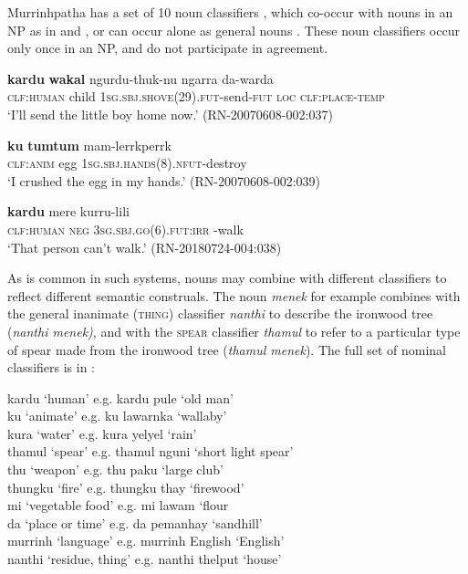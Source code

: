 \documentclass[output=paper,colorlinks,citecolor=brown]{langscibook}
\begin{document}
Murrinhpatha has a set of 10 noun classifiers \citep{Walsh1993}, which co-occur with nouns in an NP as in  and , or can occur alone as general nouns . These noun classifiers occur only once in an NP, and do not participate in agreement. 

\ea\label{ex:mur:36} 
    \gll \textbf{kardu} \textbf{wakal} ngurdu-thuk-nu ngarra da-warda\\
         \textsc{clf:human} child \textsc{1sg.sbj.shove}(29).\textsc{fut}{}-send-\textsc{fut} \textsc{loc} \textsc{clf:place-temp} \\
    \glt  ‘I’ll send the little boy home now.’ (RN-20070608-002:037)
\z 

\ea\label{ex:mur:37}
    \gll \textbf{ku} \textbf{tumtum} mam-lerrkperrk\\
         \textsc{clf:anim} egg \textsc{1sg.sbj.hands(8).nfut}{}-destroy\\
    \glt ‘I crushed the egg in my hands.’ (RN-20070608-002:039)
\z 

\ea\label{ex:mur:38}
    \gll \textbf{kardu} mere kurru-lili\\
         \textsc{clf:human} \textsc{neg} \textsc{3sg.sbj.go(6).fut:irr} {}-walk\\
    \glt ‘That person can’t walk.’ (RN-20180724-004:038)
\z 

As is common in such systems, nouns may combine with different classifiers to reflect different semantic construals. The noun \textit{menek} for example combines with the general inanimate (\textsc{thing)} classifier \textit{nanthi} to describe the ironwood tree (\textit{nanthi menek)}, and with the \textsc{spear} classifier \textit{thamul} to refer to a particular type of spear made from the ironwood tree (\textit{thamul menek}). The full set of nominal classifiers is in :

\ea\label{ex:mur:list1}
kardu  \tab ‘{human}’ \tab e.g. kardu pule ‘old man’ \\
ku  \tab ‘{animate}’ \tab e.g. ku lawarnka ‘wallaby’ \\
kura  \tab ‘{water}’ \tab e.g. kura yelyel ‘rain’ \\
thamul  \tab ‘{spear}’ \tab e.g. thamul nguni ‘short light spear’ \\
thu  \tab ‘{weapon}’ \tab e.g. thu paku ‘large club’ \\
thungku  \tab ‘{fire}’ \tab e.g. thungku thay ‘firewood’ \\
mi  \tab ‘{vegetable} {food}’ \tab e.g. mi lawam ‘flour \\
da  \tab ‘{place or time}’ \tab e.g. da pemanhay ‘sandhill’ \\
murrinh  \tab ‘{language}’ \tab e.g. murrinh English ‘English’ \\
nanthi  \tab ‘residue, thing’ \tab e.g. nanthi thelput ‘house’ \\
\z 
\end{document}
